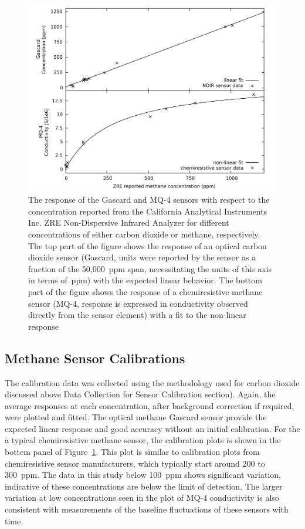 \documentclass[times]{joehreview}
\begin{document}
	\begin{figure}[!t]
		\centering
		\includegraphics[width=0.9\columnwidth]{honey9.pdf}
		\caption{The response of the Gascard and MQ-4 sensors with respect to the concentration reported from the California Analytical Instruments Inc. ZRE Non-Dispersive Infrared Analyzer for different concentrations of either carbon dioxide or methane, respectively.  The top part of the figure shows the response of an optical carbon dioxide sensor (Gascard, units were reported by the sensor as a fraction of the 50,000~ppm span, necessitating the units of this axis in terms of~ppm) with the expected linear behavior.  The bottom part of the figure shows the response of a chemiresistive methane sensor (MQ-4, response is expressed in conductivity observed directly from the sensor element) with a fit to the non-linear response}
		\label{fig:gascardcodiff}
	\end{figure}
	
	\subsection*{Methane  Sensor Calibrations}
	
	The calibration data was collected using the methodology used for carbon dioxide discussed above Data Collection for Sensor Calibration section).
	Again, the average responses at each concentration, after background correction if required, were plotted and fitted. The optical methane Gascard sensor provide the expected linear response and good accuracy without an initial calibration.  For the a typical chemiresistive methane sensor, the calibration plots is shown in the bottem panel of Figure~\ref{fig:gascardcodiff}.  This plot is similar to calibration plots from chemiresistive sensor manufacturers, which typically start around 200 to 300~ppm.  The data in this study below 100~ppm shows significant variation, indicative of these concentrations are below the limit of detection.   The larger variation at low concentrations seen in the plot of MQ-4 conductivity is also consistent with measurements of the baseline fluctuations of these sensors with time. 
	
\end{document}
